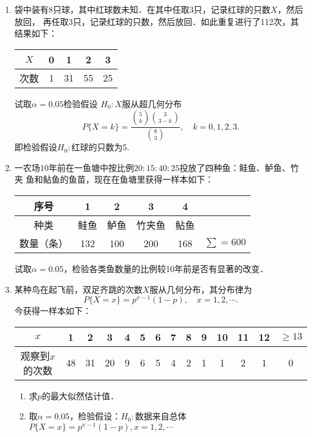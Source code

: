\documentclass[10pt,a4paper]{article}
\begin{document}
\begin{enumerate}
    \item 袋中装有8只球，其中红球数未知．在其中任取3只，记录红球的只数$X$，然后放回，
    再任取3只，记录红球的只数，然后放回．如此重复进行了112次，其结果如下：
    \renewcommand{\arraystretch}{1.3}
    \begin{table}[H]\centering
        \begin{tabular}{c|cccc}
        $X$ & 0 & 1  & 2  & 3  \\ \hline
        次数  & 1 & 31 & 55 & 25
        \end{tabular}
        \end{table}
    \renewcommand{\arraystretch}{1.0}
    试取$\alpha=0.05$检验假设
    $H_0:X$服从超几何分布
    $$P\{X=k\}=\dfrac{\binom{5}{k} \binom{3}{3-k}} {\binom{8}{3}} ,\quad k=0,1,2,3.$$
    即检验假设$H_0:$红球的只数为5.
    \clearpage





    \item 一农场10年前在一鱼塘中按比例$20:15:40:25$投放了四种鱼：鲑鱼、鲈鱼、竹夹
    鱼和鲇鱼的鱼苗，现在在鱼塘里获得一样本如下：
    \renewcommand{\arraystretch}{1.3}
    \begin{table}[H]\centering
        \begin{tabular}{c|ccccc}
        \hline
        序号    & 1   & 2   & 3   & 4   &            \\ \hline
        种类    & 鲑鱼  & 鲈鱼  & 竹夹鱼 & 鲇鱼  &            \\ \hline
        数量（条） & 132 & 100 & 200 & 168 & $\sum=600$ \\ \hline
        \end{tabular}
    \end{table}
    \renewcommand{\arraystretch}{1.0}
    试取$\alpha=0.05$，检验各类鱼数量的比例较10年前是否有显著的改变．
    \clearpage



    \item 某种鸟在起飞前，双足齐跳的次数$X$服从几何分布，其分布律为
    $$P\{X=x\}=p^{x-1}(1-p),\quad x=1,2,\cdots.$$
    今获得一样本如下：
    \renewcommand{\arraystretch}{1.3}
    \begin{table}[H]\centering
        \begin{tabular}{c|ccccccccccccc}
        $x$       & 1  & 2  & 3  & 4 & 5 & 6 & 7 & 8 & 9 & 10 & 11 & 12 & $\geq 13$ \\ \hline
        观察到$x$的次数 & 48 & 31 & 20 & 9 & 6 & 5 & 4 & 2 & 1 & 1  & 2  & 1  & 0        
        \end{tabular}
    \end{table}
    \renewcommand{\arraystretch}{1.0}
    \begin{enumerate}
        \item 求$p$的最大似然估计值．
        \item 取$\alpha=0.05$，检验假设：$H_0:$数据来自总体$P\{X=x\}=p^{x-1}(1-p),x=1,2,\cdots$
    \end{enumerate}
    \clearpage





\end{enumerate}
\end{document}

